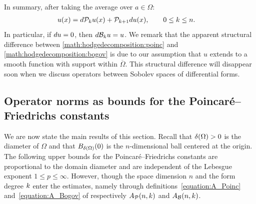 \documentclass[10pt,a4paper]{article}
\begin{document}
In summary, after taking the average over $a \in \Omega$:
\begin{align*}\label{math:hodgedecomposition:bogov}
    u(x) &= d {\mathcal P}_{k} u(x) + {\mathcal P}_{k+1} d u(x), \qquad 0 \leq k \leq n.
\end{align*}
In particular, if $d u = 0$, then $d {\mathcal B}_{k} u = u$.
We remark that the apparent structural difference between \eqref{math:hodgedecomposition:poinc} and \eqref{math:hodgedecomposition:bogov} is due to our assumption that $u$ extends to a smooth function with support within $\overline\Omega$. This structural difference will disappear soon when we discuss operators between Sobolev spaces of differential forms. 


\subsection{Operator norms as bounds for the Poincar\'e--Friedrichs constants}

We are now state the main results of this section. 
Recall that ${\delta}(\Omega) > 0$ is the diameter of $\Omega$ and that $B_{{\delta}(\Omega)}(0)$ is the $n$-dimensional ball centered at the origin.
The following upper bounds for the Poincar\'e--Friedrichs constants are proportional to the domain diameter and are independent of the Lebesgue exponent $1 \leq p \leq \infty$.
However, though the space dimension $n$ and the form degree $k$ enter the estimates, 
namely through definitions~\eqref{equation:A_Poinc} and~\eqref{equation:A_Bogov} of respectively $A_{{\mathcal P}}(n,k)$ and $A_{{\mathcal B}}(n,k)$. 
\end{document}
